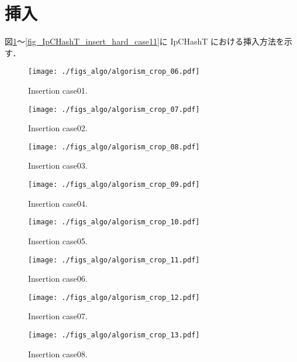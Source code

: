 \section{挿入}

図\ref{fig_IpCHashT_insert_hard_case01}〜\ref{fig_IpCHashT_insert_hard_case11}に IpCHashT における挿入方法を示す．


\begin{figure}[h]
  \texttt{[image: ./figs\_algo/algorism\_crop\_06.pdf]}
  \caption{ Insertion case01. }
  \label{fig_IpCHashT_insert_hard_case01}
\end{figure}

\begin{figure}[h]
  \texttt{[image: ./figs\_algo/algorism\_crop\_07.pdf]}
  \caption{ Insertion case02. }
  \label{fig_IpCHashT_insert_hard_case02}
\end{figure}

\begin{figure}[h]
  \texttt{[image: ./figs\_algo/algorism\_crop\_08.pdf]}
  \caption{ Insertion case03. }
  \label{fig_IpCHashT_insert_hard_case03}
\end{figure}

\begin{figure}[h]
  \texttt{[image: ./figs\_algo/algorism\_crop\_09.pdf]}
  \caption{ Insertion case04. }
  \label{fig_IpCHashT_insert_hard_case04}
\end{figure}

\begin{figure}[h]
  \texttt{[image: ./figs\_algo/algorism\_crop\_10.pdf]}
  \caption{ Insertion case05. }
  \label{fig_IpCHashT_insert_hard_case05}
\end{figure}

\begin{figure}[h]
  \texttt{[image: ./figs\_algo/algorism\_crop\_11.pdf]}
  \caption{ Insertion case06. }
  \label{fig_IpCHashT_insert_hard_case06}
\end{figure}

\begin{figure}[h]
  \texttt{[image: ./figs\_algo/algorism\_crop\_12.pdf]}
  \caption{ Insertion case07. }
  \label{fig_IpCHashT_insert_hard_case07}
\end{figure}

\begin{figure}[h]
  \texttt{[image: ./figs\_algo/algorism\_crop\_13.pdf]}
  \caption{ Insertion case08. }
  \label{fig_IpCHashT_insert_hard_case08}
\end{figure}

